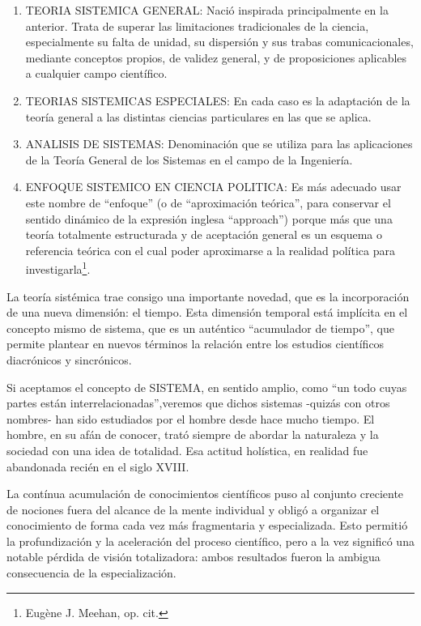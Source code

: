 \documentclass[
]{book}
\begin{document}
\begin{enumerate}
\def\labelenumi{\arabic{enumi})}
\setcounter{enumi}{1}
\item
  TEORIA SISTEMICA GENERAL: Nació inspirada principalmente en la anterior. Trata de superar las limitaciones tradicionales de la ciencia, especialmente su falta de unidad, su dispersión y sus trabas comunicacionales, mediante conceptos propios, de validez general, y de proposiciones aplicables a cualquier campo científico.
\item
  TEORIAS SISTEMICAS ESPECIALES: En cada caso es la adaptación de la teoría general a las distintas ciencias particulares en las que se aplica.
\item
  ANALISIS DE SISTEMAS: Denominación que se utiliza para las aplicaciones de la Teoría General de los Sistemas en el campo de la Ingeniería.
\item
  ENFOQUE SISTEMICO EN CIENCIA POLITICA: Es más adecuado usar este nombre de ``enfoque'' (o de ``aproximación teórica'', para conservar el sentido dinámico de la expresión inglesa ``approach'') porque más que una teoría totalmente estructurada y de aceptación general es un esquema o referencia teórica con el cual poder aproximarse a la realidad política para investigarla\footnote{Eugène J. Meehan, op. cit.}.
\end{enumerate}

La teoría sistémica trae consigo una importante novedad, que es la incorporación de una nueva dimensión: el tiempo. Esta dimensión temporal está implícita en el concepto mismo de sistema, que es un auténtico ``acumulador de tiempo'', que permite plantear en nuevos términos la relación entre los estudios científicos diacrónicos y sincrónicos.

Si aceptamos el concepto de SISTEMA, en sentido amplio, como ``un todo cuyas partes están interrelacionadas'',veremos que dichos sistemas -quizás con otros nombres- han sido estudiados por el hombre desde hace mucho tiempo. El hombre, en su afán de conocer, trató siempre de abordar la naturaleza y la sociedad con una idea de totalidad. Esa actitud holística, en realidad fue abandonada recién en el siglo XVIII.

La contínua acumulación de conocimientos científicos puso al conjunto creciente de nociones fuera del alcance de la mente individual y obligó a organizar el conocimiento de forma cada vez más fragmentaria y especializada. Esto permitió la profundización y la aceleración del proceso científico, pero a la vez significó una notable pérdida de visión totalizadora: ambos resultados fueron la ambigua consecuencia de la especialización.
\end{document}
